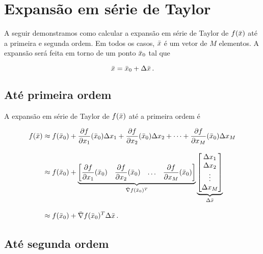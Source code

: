 \section{Expansão em série de Taylor}

A seguir demonstramos como calcular a expansão em série de Taylor de
$f(\bar{x})$ até a primeira e segunda ordem.
Em todos os casos, $\bar{x}$ é um vetor de $M$ elementos.
A expansão será feita em torno de um ponto $\bar{x}_0$ tal que

\begin{equation}
\bar{x} = \bar{x}_0 + \Delta\bar{x} \thinspace .
\end{equation}

\subsection{Até primeira ordem}

A expansão em série de Taylor de $f(\bar{x})$ até a primeira ordem é

\begin{equation}
\begin{split}
f(\bar{x}) &\approx
    f(\bar{x}_0) +
    \dfrac{\partial f}{\partial x_1}(\bar{x}_0) \Delta x_1 + 
    \dfrac{\partial f}{\partial x_2}(\bar{x}_0) \Delta x_2 +
    \dotsb + 
    \dfrac{\partial f}{\partial x_M}(\bar{x}_0) \Delta x_M
\\[0.3cm] &\approx
    f(\bar{x}_0) +
    \underbrace{
    \begin{bmatrix}
    \dfrac{\partial f}{\partial x_1}(\bar{x}_0) &
    \dfrac{\partial f}{\partial x_2}(\bar{x}_0) &
    \ldots &
    \dfrac{\partial f}{\partial x_M}(\bar{x}_0)
    \end{bmatrix}}_{\bar{\nabla}f(\bar{x}_0)^T}
    \underbrace{
    \begin{bmatrix}
    \Delta x_1 \\ \Delta x_2 \\ \vdots \\ \Delta x_M
    \end{bmatrix}}_{\Delta\bar{x}}
\\[0.3cm]
&\approx f(\bar{x}_0) + \bar{\nabla}f(\bar{x}_0)^T \Delta\bar{x}
\thinspace .
\end{split}
\label{eq:taylor_order1}
\end{equation}

\subsection{Até segunda ordem}

